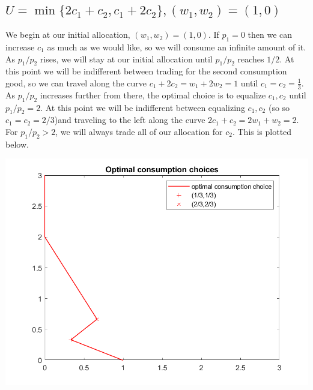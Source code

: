 \documentclass[11pt]{article} %
\begin{document}
\subsection{$U = \min \{ 2c_1 + c_2, c_1 + 2 c_2\}, (w_1,w_2) = (1,0)$}
We begin at our initial allocation, $(w_1,w_2) = (1,0).$ If $p_1 = 0$ then we can increase $c_1$ as much as we would like, so we will consume an infinite amount of it. As $p_1/p_2$ rises, we will stay at our initial allocation until $p_1/p_2$ reaches $1/2$. At this point we will be indifferent between trading for the second consumption good, so we can travel along the curve $c_1 + 2c_2 = w_1 + 2w_2 = 1$ until $c_1 = c_2 = \frac{1}{3}$. As $p_1/p_2$ increases further from there, the optimal choice is to equalize $c_1,c_2$ until $p_1/p_2 = 2$. At this point we will be indifferent between equalizing $c_1,c_2$ (so so $c_1 = c_2 = 2/3$)and traveling to the left along the curve $2c_1 + c_2 = 2w_1 +w_2 = 2$. For $p_1/p_2>2$, we will always trade all of our allocation for $c_2$. This is plotted below.

\includegraphics{indiff2}
\end{document}
